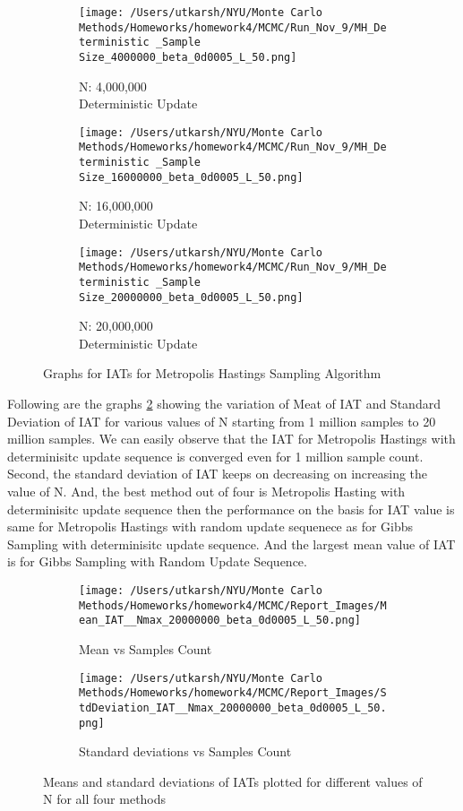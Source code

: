 \documentclass[11pt]{article}
\begin{document}
\begin{figure}[H]
\begin{subfigure}{.22\textwidth}
		\texttt{[image: /Users/utkarsh/NYU/Monte Carlo Methods/Homeworks/homework4/MCMC/Run\_Nov\_9/MH\_Deterministic \_Sample Size\_4000000\_beta\_0d0005\_L\_50.png]}
		\caption{N: 4,000,000\\Deterministic Update}
	\end{subfigure}
	\begin{subfigure}{.22\textwidth}
		\texttt{[image: /Users/utkarsh/NYU/Monte Carlo Methods/Homeworks/homework4/MCMC/Run\_Nov\_9/MH\_Deterministic \_Sample Size\_16000000\_beta\_0d0005\_L\_50.png]}
		\caption{N: 16,000,000\\Deterministic Update}
	\end{subfigure}
	\begin{subfigure}{.22\textwidth}
		\texttt{[image: /Users/utkarsh/NYU/Monte Carlo Methods/Homeworks/homework4/MCMC/Run\_Nov\_9/MH\_Deterministic \_Sample Size\_20000000\_beta\_0d0005\_L\_50.png]}
		\caption{N: 20,000,000\\Deterministic Update}
	\end{subfigure}
    \caption{Graphs for IATs for Metropolis Hastings Sampling Algorithm}
	\label{fig:iat_metropolis}
\end{figure}

Following are the graphs \ref{fig:iat_mean_var_normal} showing the variation of Meat of IAT and Standard Deviation of IAT for various values of N starting from 1 million samples to 20 million samples.
We can easily observe that the IAT for Metropolis Hastings with determinisitc update sequence is converged even for 1 million sample count. Second, the standard deviation of IAT keeps on decreasing on increasing the value of N.
And, the best method out of four is Metropolis Hasting with determinisitc update sequence then the performance on the basis for IAT value is same for Metropolis Hastings with random update sequenece as for Gibbs Sampling with determinisitc update sequence. And the
largest mean value of IAT is for Gibbs Sampling with Random Update Sequence.

\begin{figure}[H]
	\centering
	\begin{subfigure}{.48\textwidth}
		\texttt{[image: /Users/utkarsh/NYU/Monte Carlo Methods/Homeworks/homework4/MCMC/Report\_Images/Mean\_IAT\_\_Nmax\_20000000\_beta\_0d0005\_L\_50.png]}
		\caption{Mean vs Samples Count}
	\end{subfigure}
	\begin{subfigure}{.48\textwidth}
		\texttt{[image: /Users/utkarsh/NYU/Monte Carlo Methods/Homeworks/homework4/MCMC/Report\_Images/StdDeviation\_IAT\_\_Nmax\_20000000\_beta\_0d0005\_L\_50.png]}
		\caption{Standard deviations vs Samples Count}
	\end{subfigure}
    \caption{Means and standard deviations of IATs plotted for different values of N for all four methods}
	\label{fig:iat_mean_var_normal}
\end{figure}
\end{document}
